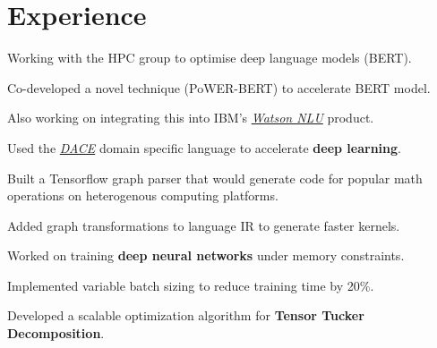 \documentclass[]{smresume}
\begin{document}
\begin{minipage}[t]{0.66\textwidth} 


\section{Experience}
\vspace{\topsep} %
\begin{tightemize}
\item Working with the HPC group to optimise deep language models (BERT).
\item Co-developed a novel technique (PoWER-BERT) to accelerate BERT model.
\item Also working on integrating this into IBM's \emph{\href{https://www.ibm.com/in-en/cloud/watson-natural-language-understanding}{Watson NLU}} product.
\end{tightemize}
\subsectionsep

\begin{tightemize}
\item Used the \emph{\href{http://spcl.inf.ethz.ch/Research/DAPP/}{DACE}} domain specific language to accelerate \textbf{deep learning}.
\item Built a Tensorflow graph parser that would generate code for popular math operations on heterogenous computing platforms.
\item Added graph transformations to language IR to generate faster kernels.
\end{tightemize}
\subsectionsep

\begin{tightemize}
\item Worked on training \textbf{deep neural networks} under memory constraints.
\item Implemented variable batch sizing to reduce training time by 20\%. 
\item Developed a scalable optimization algorithm for \textbf{Tensor Tucker Decomposition}.
\end{tightemize}
\subsectionsep


\end{minipage}
\end{document}

